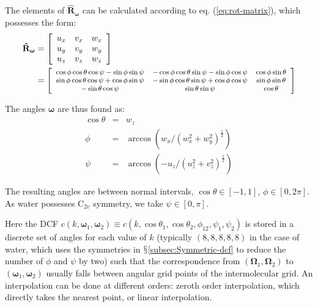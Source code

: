 The elements of $\mathbf{\hat{R}}_{\boldsymbol{\omega}}$ can be calculated
according to eq. (\ref{eq:rot-matrix}), which possesses the form:
\begin{align}
\mathbf{\hat{R}}_{\boldsymbol{\omega}} & =\left[\begin{array}{ccc}
u_{x} & v_{x} & w_{x}\\
u_{y} & v_{y} & w_{y}\\
u_{z} & v_{z} & w_{z}
\end{array}\right]\\
 & =\footnotesize\left[\begin{array}{ccc}
\cos\phi\cos\theta\cos\psi-\sin\phi\sin\psi & -\cos\phi\cos\theta\sin\psi-\sin\phi\cos\psi & \cos\phi\sin\theta\\
\sin\phi\cos\theta\cos\psi+\cos\phi\sin\psi & -\sin\phi\cos\theta\sin\psi+\cos\phi\cos\psi & \sin\phi\sin\theta\\
-\sin\theta\cos\psi & \sin\theta\sin\psi & \cos\theta
\end{array}\right]\nonumber 
\end{align}

The angles $\boldsymbol{\omega}$ are thus found as:
\begin{eqnarray}
\cos\theta & = & w_{z}\nonumber \\
\phi & = & \arccos(w_{x}/(w_{x}^{2}+w_{y}^{2})^{\frac{1}{2}})\label{eq:omega}\\
\psi & = & \arccos(-u_{z}/(u_{z}^{2}+v_{z}^{2})^{\frac{1}{2}})\nonumber 
\end{eqnarray}

The resulting angles are between normal intervals, $\cos\theta\in\left[-1,1\right]$,
$\phi\in\left[0,2\pi\right]$. As water possesses $\mathrm{C}_{2v}$
symmetry, we take $\psi\in\left[0,\pi\right]$. 

Here the \acs{DCF} $c(k,\boldsymbol{\omega}_{1},\boldsymbol{\omega}_{2})\equiv c(k,\cos\theta_{1},\cos\theta_{2},\phi_{12},\psi_{1},\psi_{2})$
is stored in a discrete set of angles for each value of $k$ (typically
$(8,8,8,8,8)$ in the case of water, which uses the symmetries in
$\mathsection$\ref{subsec:Symmetric-dcf} to reduce the number of
$\phi$ and $\psi$ by two) such that the correspondence from $(\mathbf{\Omega}_{1},\mathbf{\Omega}_{2})$
to $(\boldsymbol{\omega}_{1},\boldsymbol{\omega}_{2})$ usually falls
between angular grid points of the intermolecular grid. An interpolation
can be done at different orders: zeroth order interpolation, which
directly takes the nearest point, or linear interpolation.

